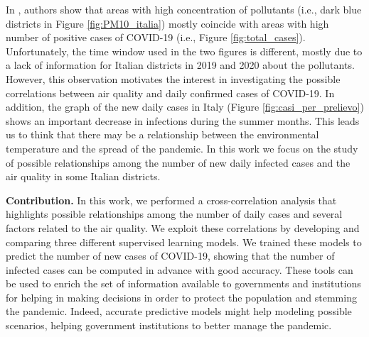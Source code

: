 \documentclass[review]{elsarticle}
\begin{document}
In \cite{becchetti2020understanding}, authors show that areas with high concentration of pollutants (i.e., dark blue districts in Figure \ref{fig:PM10_italia}) mostly coincide with areas with high number of positive cases of COVID-19 (i.e., Figure \ref{fig:total_cases}).
Unfortunately, the time window used in the two figures is different, mostly due to a lack of information for Italian districts in 2019 and 2020 about the pollutants. However, this observation motivates the interest in investigating the possible correlations between air quality and daily confirmed cases of COVID-19. In addition, the graph of the new daily cases in Italy (Figure \ref{fig:casi_per_prelievo}) shows an important decrease in infections during the summer months. This leads us to think that there may be a relationship between the environmental temperature and the spread of the pandemic.
In this work we focus on the study of possible relationships among the number of new daily infected cases and the air quality in some Italian districts. %

\textbf{Contribution. } In this work, %
we performed a cross-correlation analysis that highlights possible relationships among the number of daily cases and several factors related to the air quality. %
We exploit these correlations by developing and comparing three different supervised learning models. We trained these models to predict the number of new cases of COVID-19, showing that the number of infected cases can be computed in advance with good accuracy. These tools can be used to enrich the set of information available to governments and institutions for helping in making decisions in order to protect the population and stemming the pandemic. Indeed, accurate predictive models might help modeling possible scenarios, helping government institutions to better manage the pandemic.%
\end{document}
